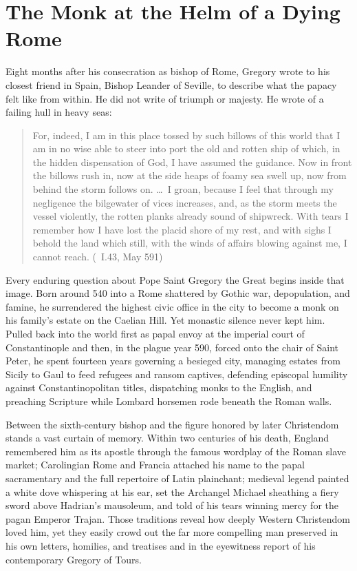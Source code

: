 \section{The Monk at the Helm of a Dying Rome}

Eight months after his consecration as bishop of Rome, Gregory wrote to his
closest friend in Spain, Bishop Leander of Seville, to describe what the papacy
felt like from within. He did not write of triumph or majesty. He wrote of a
failing hull in heavy seas:

\begin{quote}
For, indeed, I am in this place tossed by such billows of this world that I am
in no wise able to steer into port the old and rotten ship of which, in the
hidden dispensation of God, I have assumed the guidance. Now in front the
billows rush in, now at the side heaps of foamy sea swell up, now from behind
the storm follows on. \dots\ I groan, because I feel that through my negligence
the bilgewater of vices increases, and, as the storm meets the vessel
violently, the rotten planks already sound of shipwreck. With tears I remember
how I have lost the placid shore of my rest, and with sighs I behold the land
which still, with the winds of affairs blowing against me, I cannot reach.
(\ I.43, May 591)
\end{quote}

Every enduring question about Pope Saint Gregory the Great begins inside that
image. Born around 540 into a Rome shattered by Gothic war, depopulation, and
famine, he surrendered the highest civic office in the city to become a monk on
his family's estate on the Caelian Hill. Yet monastic silence never kept him.
Pulled back into the world first as papal envoy at the imperial court of
Constantinople and then, in the plague year 590, forced onto the chair of Saint
Peter, he spent fourteen years governing a besieged city, managing estates from
Sicily to Gaul to feed refugees and ransom captives, defending episcopal
humility against Constantinopolitan titles, dispatching monks to the English,
and preaching Scripture while Lombard horsemen rode beneath the Roman walls.

Between the sixth-century bishop and the figure honored by later Christendom
stands a vast curtain of memory. Within two centuries of his death, England
remembered him as its apostle through the famous wordplay of the Roman slave
market; Carolingian Rome and Francia attached his name to the papal
sacramentary and the full repertoire of Latin plainchant; medieval legend
painted a white dove whispering at his ear, set the Archangel Michael sheathing
a fiery sword above Hadrian's mausoleum, and told of his tears winning mercy
for the pagan Emperor Trajan. Those traditions reveal how deeply Western
Christendom loved him, yet they easily crowd out the far more compelling man
preserved in his own letters, homilies, and treatises and in the eyewitness
report of his contemporary Gregory of Tours.

